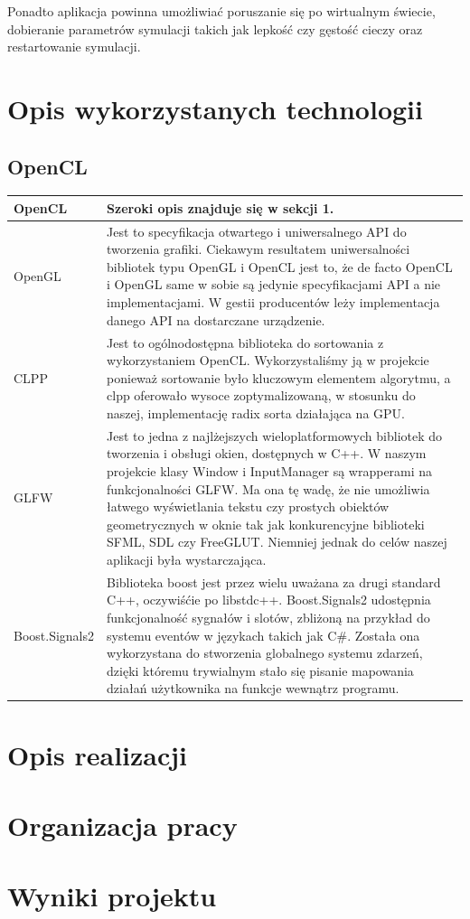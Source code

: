 \documentclass[polish, 12pt]{aghthesis}
\begin{document}
		Ponadto aplikacja powinna umożliwiać poruszanie się po wirtualnym świecie, dobieranie parametrów symulacji takich jak lepkość czy gęstość cieczy oraz restartowanie symulacji.
	
\section{Opis wykorzystanych technologii}
	\subsection{OpenCL}
\begin{tabular}{| p{} | p{} |}
		\hline
			OpenCL & Szeroki opis znajduje się w sekcji 1. \\
		\hline
			OpenGL &  Jest to specyfikacja otwartego i uniwersalnego API do tworzenia grafiki. Ciekawym resultatem uniwersalności bibliotek typu OpenGL i OpenCL jest to, że de facto OpenCL i OpenGL same w sobie są jedynie specyfikacjami API a nie implementacjami. W gestii producentów leży implementacja danego API na dostarczane urządzenie.\\
		\hline
			CLPP &  Jest to ogólnodostępna biblioteka do sortowania z wykorzystaniem OpenCL. Wykorzystaliśmy ją w projekcie ponieważ sortowanie było kluczowym elementem algorytmu, a clpp oferowało wysoce zoptymalizowaną, w stosunku do naszej, implementację radix sorta działająca na GPU.\\
		\hline
			GLFW &  Jest to jedna z najlżejszych wieloplatformowych bibliotek do tworzenia i obsługi okien, dostępnych w C++. W naszym projekcie klasy Window i InputManager są wrapperami na funkcjonalności GLFW. Ma ona tę wadę, że nie umożliwia łatwego wyświetlania tekstu czy prostych obiektów geometrycznych w oknie tak jak konkurencyjne biblioteki SFML, SDL czy FreeGLUT. Niemniej jednak do celów naszej aplikacji była wystarczająca. \\
		\hline
			Boost.Signals2 &  Biblioteka boost jest przez wielu uważana za drugi standard C++, oczywiśćie po libstdc++. Boost.Signals2 udostępnia funkcjonalność sygnałów i slotów, zbliżoną na przykład do systemu eventów w językach takich jak C\#. Została ona wykorzystana do stworzenia globalnego systemu zdarzeń, dzięki któremu trywialnym stało się pisanie mapowania działań użytkownika na funkcje wewnątrz programu. \\
		\hline	
\end{tabular}

\section{Opis realizacji}
\section{Organizacja pracy}
\section{Wyniki projektu}

\end{document}
